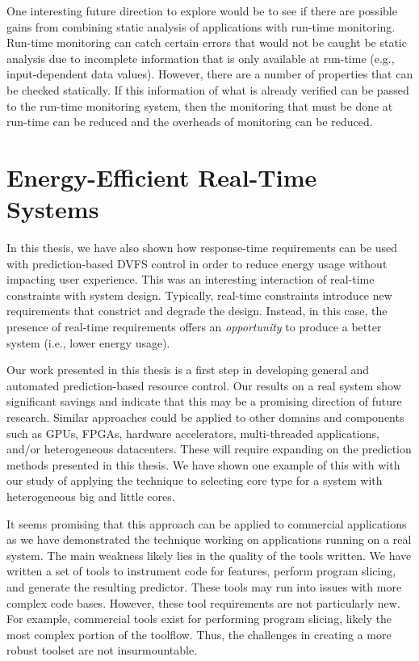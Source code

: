 One interesting future direction to explore would be to see if there are
possible gains from combining static analysis of applications with run-time
monitoring. Run-time monitoring can catch certain errors that would not be
caught be static analysis due to incomplete information that is only available
at run-time (e.g., input-dependent data values). However, there are a number of
properties that can be checked statically. If this information of what is
already verified can be passed to the run-time monitoring system, then the
monitoring that must be done at run-time can be reduced and the overheads of
monitoring can be reduced.

\section{Energy-Efficient Real-Time Systems}

In this thesis, we have also shown how response-time requirements can be used
with prediction-based DVFS control in order to reduce energy usage without
impacting user experience. This was an interesting interaction of real-time
constraints with system design. Typically, real-time constraints introduce new
requirements that constrict and degrade the design. Instead, in this case, the
presence of real-time requirements offers an \emph{opportunity} to produce a
better system (i.e., lower energy usage).

Our work presented in this thesis is a first step in developing general and
automated prediction-based resource control. Our results on a real system show
significant savings and indicate that this may be a promising direction of
future research. Similar approaches could be applied to other domains and
components such as GPUs, FPGAs, hardware accelerators, multi-threaded
applications, and/or heterogeneous datacenters. These will require expanding on
the prediction methods presented in this thesis. We have shown one example of
this with with our study of applying the technique to selecting core type for a
system with heterogeneous big and little cores.

It seems promising that this approach can be applied to commercial applications
as we have demonstrated the technique working on applications running on a real
system. The main weakness likely lies in the quality of the tools written. We
have written a set of tools to instrument code for features, perform program
slicing, and generate the resulting predictor. These tools may run into issues
with more complex code bases. However, these tool requirements are not
particularly new. For example, commercial tools exist for performing program
slicing, likely the most complex portion of the toolflow. Thus, the challenges
in creating a more robust toolset are not insurmountable. 

